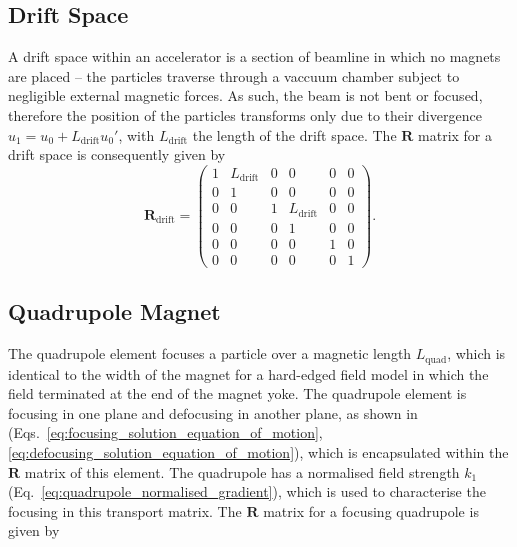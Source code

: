 \documentclass[../main.tex]{subfiles}
\begin{document}
\subsection{Drift Space}

A drift space within an accelerator is a section of beamline in which no magnets are placed -- the particles traverse through a vaccuum chamber subject to negligible external magnetic forces. As such, the beam is not bent or focused, therefore the position of the particles transforms only due to their divergence $u_{1} = u_{0} + L_{\mathrm{drift}}u_{0}'$, with $L_{\mathrm{drift}}$ the length of the drift space. The $\boldsymbol{R}$ matrix for a drift space is consequently given by  
\begin{equation}
\boldsymbol{R}_{\mathrm{drift}} =
\begin{pmatrix}
1 & L_{\mathrm{drift}} & 0 & 0 & 0 & 0 \\
0 & 1 & 0 & 0 & 0 & 0 \\
0 & 0 & 1 & L_{\mathrm{drift}} & 0 & 0 \\
0 & 0 & 0 & 1 & 0 & 0 \\
0 & 0 & 0 & 0 & 1 & 0 \\
0 & 0 & 0 & 0 & 0 & 1
\end{pmatrix}.
\label{eq:drift_matrix}    
\end{equation}

\subsection{Quadrupole Magnet}

The quadrupole element focuses a particle over a magnetic length $L_{\mathrm{quad}}$, which is identical to the width of the magnet for a hard-edged field model in which the field terminated at the end of the magnet yoke. The quadrupole element is focusing in one plane and defocusing in another plane, as shown in (Eqs.~\ref{eq:focusing_solution_equation_of_motion}, \ref{eq:defocusing_solution_equation_of_motion}), which is encapsulated within the $\boldsymbol{R}$ matrix of this element. The quadrupole has a normalised field strength $k_{1}$ (Eq.~\ref{eq:quadrupole_normalised_gradient}), which is used to characterise the focusing in this transport matrix. The $\boldsymbol{R}$ matrix for a focusing quadrupole is given by
\end{document}
